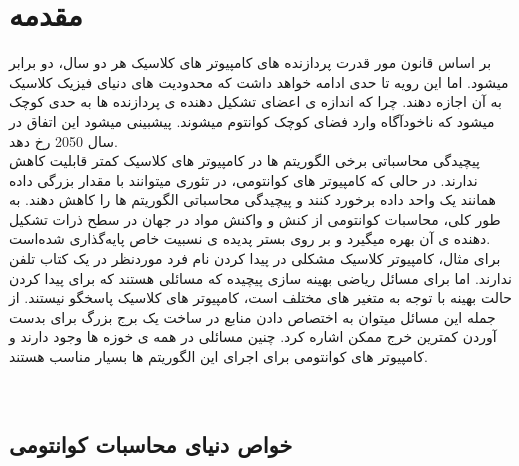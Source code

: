 \chapter{مقدمه}
بر اساس قانون مور
قدرت پردازنده های کامپیوتر های کلاسیک هر دو سال، دو برابر میشود. اما این رویه تا حدی ادامه خواهد داشت که محدودیت های دنیای فیزیک کلاسیک به آن اجازه دهند. چرا که اندازه ی اعضای تشکیل دهنده ی پردازنده ها به حدی کوچک میشود که ناخودآگاه وارد فضای کوچک کوانتوم
 میشوند. پیشبینی میشود این اتفاق در سال 2050 رخ دهد.
\\
 پیچیدگی محاسباتی
 برخی الگوریتم ها در کامپیوتر های کلاسیک کمتر قابلیت کاهش ندارند. در حالی که کامپیوتر های کوانتومی، در تئوری میتوانند با مقدار بزرگی داده همانند یک واحد داده برخورد کنند و پیچیدگی محاسباتی الگوریتم ها را کاهش دهند.
\cite{singhbook1in2}
به طور کلی، محاسبات کوانتومی از کنش و واکنش مواد در جهان در سطح ذرات تشکیل دهنده ی آن بهره میگیرد و بر روی بستر پدیده ی نسبیت خاص
 پایه‌گذاری شده‌است. 
\\
برای مثال، کامپیوتر کلاسیک مشکلی در پیدا کردن نام فرد موردنظر در یک کتاب تلفن ندارند. اما برای مسائل ریاضی بهینه سازی پیچیده
  که مسائلی هستند که برای پیدا کردن حالت بهینه با توجه به متغیر های مختلف است، کامپیوتر های کلاسیک پاسخگو نیستند. از جمله این مسائل میتوان به اختصاص دادن منابع در ساخت یک برج بزرگ برای بدست آوردن کمترین خرج ممکن اشاره کرد.  چنین مسائلی در همه ی خوزه ها وجود دارند و کامپیوتر های کوانتومی برای اجرای این الگوریتم ها بسیار مناسب هستند. 
\cite{singhbook1in4}

‌\section{‌خواص دنیای محاسبات کوانتومی}
